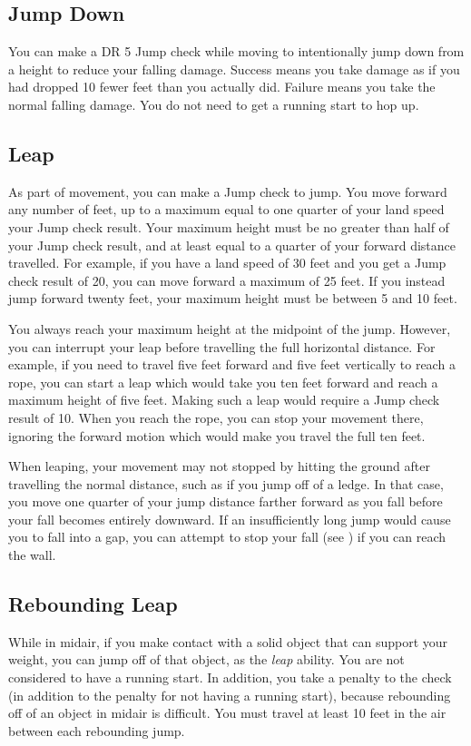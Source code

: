     \subsection{Jump Down}
        You can make a DR 5 Jump check while moving to intentionally jump down from a height to reduce your falling damage. Success means you take damage as if you had dropped 10 fewer feet than you actually did. Failure means you take the normal falling damage. You do not need to get a running start to hop up.

    \subsection{Leap}\label{Leap}
        As part of movement, you can make a Jump check to jump.
        You move forward any number of feet, up to a maximum equal to one quarter of your land speed \add your Jump check result.
        Your maximum height must be no greater than half of your Jump check result, and at least equal to a quarter of your forward distance travelled.
        For example, if you have a land speed of 30 feet and you get a Jump check result of 20, you can move forward a maximum of 25 feet.
        If you instead jump forward twenty feet, your maximum height must be between 5 and 10 feet.

        You always reach your maximum height at the midpoint of the jump.
        However, you can interrupt your leap before travelling the full horizontal distance.
        For example, if you need to travel five feet forward and five feet vertically to reach a rope, you can start a leap which would take you ten feet forward and reach a maximum height of five feet.
        Making such a leap would require a Jump check result of 10.
        When you reach the rope, you can stop your movement there, ignoring the forward motion which would make you travel the full ten feet.

        When leaping, your movement may not stopped by hitting the ground after travelling the normal distance, such as if you jump off of a ledge.
        In that case, you move one quarter of your jump distance farther forward as you fall before your fall becomes entirely downward.
        If an insufficiently long jump would cause you to fall into a gap, you can attempt to stop your fall (see ) if you can reach the wall.

    \subsection{Rebounding Leap}\label{Rebounding Leap}
        While in midair, if you make contact with a solid object that can support your weight, you can jump off of that object, as the \textit{leap} ability.
        You are not considered to have a running start.
        In addition, you take a  penalty to the check (in addition to the penalty for not having a running start), because rebounding off of an object in midair is difficult.
        You must travel at least 10 feet in the air between each rebounding jump.

